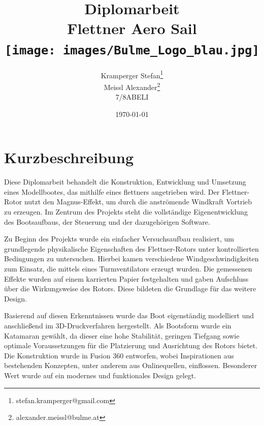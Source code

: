 \documentclass[a4paper,12pt]{article}
\begin{document}
\title{
  Diplomarbeit\\
  Flettner Aero Sail\\[1cm]
  \texttt{[image: images/Bulme\_Logo\_blau.jpg]}
}


\author{Kramperger Stefan\footnote{stefan.kramperger@gmail.com} \\ 
Meissl Alexander\footnote{alexander.meissl@bulme.at} \\
7/8ABELI}
\date{\today}
\maketitle
\newpage

\setcounter{page}{1}

\section*{Kurzbeschreibung}
\label{sec:Kurzbeschreibung}

Diese Diplomarbeit behandelt die Konstruktion, Entwicklung und Umsetzung eines Modellbootes, das mithilfe eines \gls{flettner}s angetrieben wird. Der Flettner-Rotor nutzt den Magnus-Effekt, um durch die anströmende Windkraft Vortrieb zu erzeugen. Im Zentrum des Projekts steht die vollständige Eigenentwicklung des Bootsaufbaus, der Steuerung und der dazugehörigen Software.\newline

Zu Beginn des Projekts wurde ein einfacher Versuchsaufbau realisiert, um grundlegende physikalische Eigenschaften des Flettner-Rotors unter kontrollierten Bedingungen zu untersuchen. Hierbei kamen verschiedene Windgeschwindigkeiten zum Einsatz, die mittels eines Turmventilators erzeugt wurden. Die gemessenen Effekte wurden auf einem karrierten Papier festgehalten und gaben Aufschluss über die Wirkungsweise des Rotors. Diese bildeten die Grundlage für das weitere Design. \newline

Basierend auf diesen Erkenntnissen wurde das Boot eigenständig modelliert und anschließend im 3D-Druckverfahren hergestellt. Als Bootsform wurde ein Katamaran gewählt, da dieser eine hohe Stabilität, geringen Tiefgang sowie optimale Voraussetzungen für die Platzierung und Ausrichtung des Rotors bietet. Die Konstruktion wurde in Fusion 360 entworfen, wobei Inspirationen aus bestehenden Konzepten, unter anderem aus Onlinequellen, einflossen. Besonderer Wert wurde auf ein modernes und funktionales Design gelegt.\newline
\end{document}
